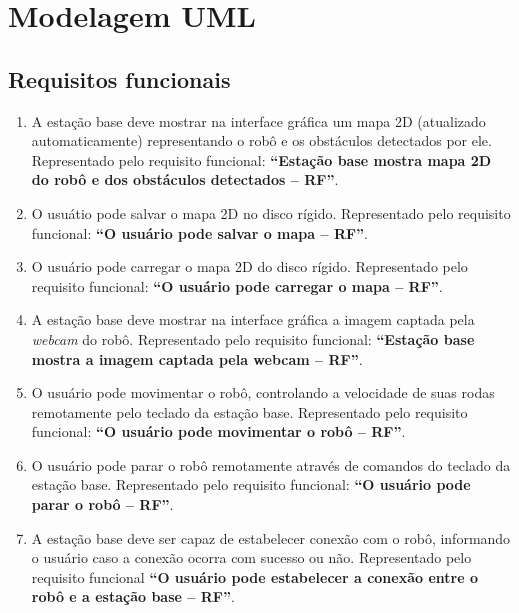 \chapter{Modelagem UML}

\section{Requisitos funcionais}

\begin{enumerate}[topsep=0pt, partopsep=0pt, itemsep=0pt]
  \item A estação base deve mostrar na interface gráfica um mapa 2D (atualizado automaticamente) representando o robô e os obstáculos detectados por ele. Representado pelo requisito funcional: \textbf{``Estação base mostra mapa 2D do robô e dos obstáculos detectados -- RF''}.
  \item O usuátio pode salvar o mapa 2D no disco rígido. Representado pelo requisito funcional: \textbf{``O usuário pode salvar o mapa -- RF''}.
  \item O usuário pode carregar o mapa 2D do disco rígido. Representado pelo requisito funcional: \textbf{``O usuário pode carregar o mapa -- RF''}.
  \item A estação base deve mostrar na interface gráfica a imagem captada pela \textit{webcam} do robô. Representado pelo requisito funcional: \textbf{``Estação base mostra a imagem captada pela webcam -- RF''}.
  \item O usuário pode movimentar o robô, controlando a velocidade de suas rodas remotamente pelo teclado da estação base. Representado pelo requisito funcional: \textbf{``O usuário pode movimentar o robô -- RF''}.
  \item O usuário pode parar o robô remotamente através de comandos do teclado da estação base. Representado pelo requisito funcional: \textbf{``O usuário pode parar o robô -- RF''}.
  \item A estação base deve ser capaz de estabelecer conexão com o robô, informando o usuário caso a conexão ocorra com sucesso ou não. Representado pelo requisito funcional \textbf{``O usuário pode estabelecer a conexão entre o robô e a estação base -- RF''}.
\end{enumerate}

